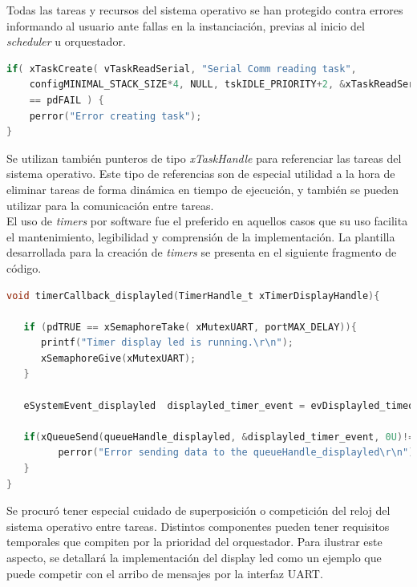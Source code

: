 Todas las tareas y recursos del sistema operativo se han protegido contra errores informando al usuario ante fallas en la instanciación, previas al inicio del \textit{scheduler} u orquestador.

\begin{lstlisting}[caption=Ejemplo de protección en la creación de tarea al inicio del orquestador.,
	language=C, 
	backgroundcolor=\color{mygray}
	]
if( xTaskCreate( vTaskReadSerial, "Serial Comm reading task", 
    configMINIMAL_STACK_SIZE*4, NULL, tskIDLE_PRIORITY+2, &xTaskReadSerialHandler) 
    == pdFAIL ) {
    perror("Error creating task");
}
\end{lstlisting}

Se utilizan también punteros de tipo \textit{xTaskHandle} para referenciar las tareas del sistema operativo. Este tipo de referencias son de especial utilidad a la hora de eliminar tareas de forma dinámica en tiempo de ejecución, y también se pueden utilizar para la comunicación entre tareas.\\

El uso de \textit{timers} por software fue el preferido en aquellos casos que su uso facilita el mantenimiento, legibilidad y comprensión de la implementación. La plantilla desarrollada para la creación de \textit{timers} se presenta en el siguiente fragmento de código.

\begin{lstlisting}[caption=Ejemplo de creación de temporizadores por software.,
	language=C, 
	backgroundcolor=\color{mygray},
	]
void timerCallback_displayled(TimerHandle_t xTimerDisplayHandle){

   if (pdTRUE == xSemaphoreTake( xMutexUART, portMAX_DELAY)){
      printf("Timer display led is running.\r\n");
      xSemaphoreGive(xMutexUART);
   }

   eSystemEvent_displayled  displayled_timer_event = evDisplayled_timeout;
   
   if(xQueueSend(queueHandle_displayled, &displayled_timer_event, 0U)!=pdPASS){
         perror("Error sending data to the queueHandle_displayled\r\n");
   }
}

\end{lstlisting}

Se procuró tener especial cuidado de superposición o competición del reloj del sistema operativo entre tareas. Distintos componentes pueden tener requisitos temporales que compiten por la prioridad del orquestador. Para ilustrar este aspecto, se detallará la implementación del display led como un ejemplo que puede competir con el arribo de mensajes por la interfaz UART.\\

